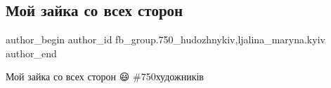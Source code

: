  
 
 
 
 

\subsection{Мой зайка со всех сторон}
\label{sec:26_03_2018.fb.fb_group.750_hudozhnykiv.1.moj_zajka_so_vseh_storon}
 
\ifcmt
 author_begin
   author_id fb_group.750_hudozhnykiv,ljalina_maryna.kyiv
 author_end
\fi

Мой зайка со всех сторон 😃 \#750художників

